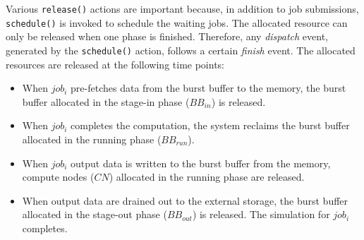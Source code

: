 Various \texttt{release()} actions are important because, in addition to job submissions,
\texttt{schedule()} is invoked to schedule the waiting jobs.
The allocated resource can only be released when one phase is finished.
Therefore, any \textit{dispatch} event, generated by the \texttt{schedule()} action,
follows a certain \textit{finish} event.
The allocated resources are released at the following time points:
\begin{itemize}
        \item When $job_i$ pre-fetches data from the burst buffer to the memory,
                the burst buffer allocated in the stage-in phase ($BB_{in}$) is released.
        \item When $job_i$ completes the computation,
                the system reclaims the burst buffer allocated in the running phase ($BB_{run}$).
        \item When $job_i$ output data is written to the burst buffer from the memory,
              compute nodes ($CN$) allocated in the running phase are released.
        \item When output data are drained out to the external storage,
                the burst buffer allocated in the stage-out phase ($BB_{out}$) is released.
                The simulation for $job_i$ completes.
\end{itemize}




% 


